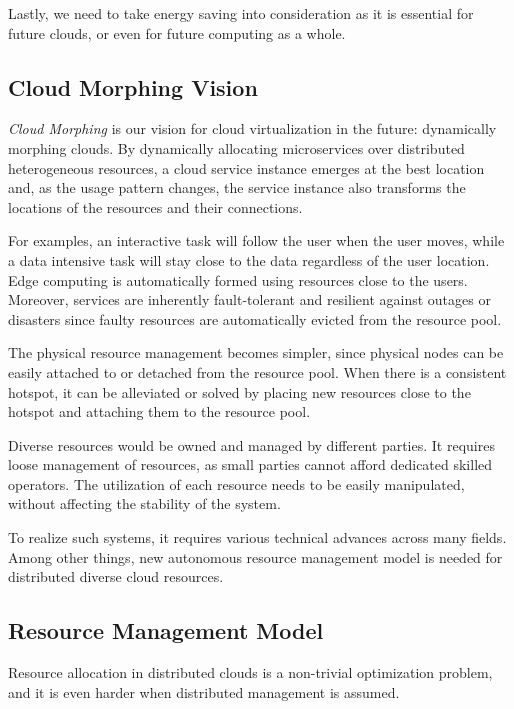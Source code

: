 Lastly, we need to take energy saving into consideration as it is
essential for future clouds, or even for future computing as a whole.

\subsection{Cloud Morphing Vision}

{\em Cloud Morphing} is our vision for cloud virtualization in the future:
dynamically morphing clouds.
By dynamically allocating microservices over distributed
heterogeneous resources, a cloud service instance emerges at the best
location and, as the usage pattern changes, the service instance also
transforms the locations of the resources and their connections.

For examples, an interactive task will follow the user when the user
moves, while a data intensive task will stay close to the data
regardless of the user location.
Edge computing is automatically formed using resources close to
the users.
Moreover, services are inherently fault-tolerant and resilient
against outages or disasters since faulty resources are
automatically evicted from the resource pool.

The physical resource management becomes simpler, since physical nodes
can be easily attached to or detached from the resource pool.
When there is a consistent hotspot, it can be alleviated or solved by
placing new resources close to the hotspot and attaching them to the
resource pool.

Diverse resources would be owned and managed by different parties.
It requires loose management of resources, as small parties cannot
afford dedicated skilled operators.
The utilization of each resource needs to be easily manipulated,
without affecting the stability of the system.

To realize such systems, it requires various technical advances across
many fields.  Among other things, new autonomous resource management
model is needed for distributed diverse cloud resources.

\subsection{Resource Management Model}

Resource allocation in distributed clouds is a non-trivial
optimization problem, and it is even harder when distributed
management is assumed.

